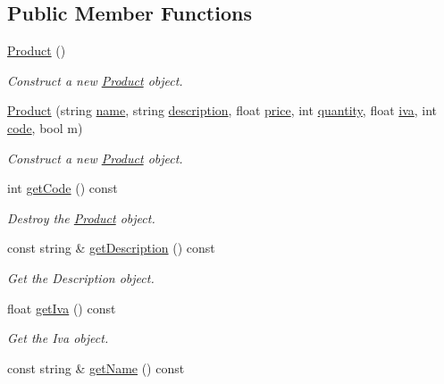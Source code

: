\subsection*{Public Member Functions}
\begin{DoxyCompactItemize}
\item 
\hyperlink{classProduct_a847c1d85e67ce387166a597579a55135}{Product} ()
\begin{DoxyCompactList}\small\item\em Construct a new \hyperlink{classProduct}{Product} object. \end{DoxyCompactList}\item 
\hyperlink{classProduct_af5787b56a6be5a1807ceb7999c6adb6a}{Product} (string \hyperlink{classProduct_acc9bddcf74112d85a6dc231db2269b8d}{name}, string \hyperlink{classProduct_ac39d552b24ce60549271a85aea3f5ed0}{description}, float \hyperlink{classProduct_ad1fd6ee6c8653bf81898668b1d01b05d}{price}, int \hyperlink{classProduct_a299430b8756aba9f6d44af46831791cc}{quantity}, float \hyperlink{classProduct_ac772b7a57928ccfdb02309bde2e4fa33}{iva}, int \hyperlink{classProduct_acf4c1bb9d62717e3b2ecaaf7ec5dffd7}{code}, bool m)
\begin{DoxyCompactList}\small\item\em Construct a new \hyperlink{classProduct}{Product} object. \end{DoxyCompactList}\item 
int \hyperlink{classProduct_ada9a32ed7891875b3ccd8e064aad6492}{get\+Code} () const
\begin{DoxyCompactList}\small\item\em Destroy the \hyperlink{classProduct}{Product} object. \end{DoxyCompactList}\item 
const string \& \hyperlink{classProduct_afffde8c14c3bca709543cea274d67e7c}{get\+Description} () const
\begin{DoxyCompactList}\small\item\em Get the Description object. \end{DoxyCompactList}\item 
float \hyperlink{classProduct_a50605c5d457a7400a8dd5a0848480297}{get\+Iva} () const
\begin{DoxyCompactList}\small\item\em Get the Iva object. \end{DoxyCompactList}\item 
const string \& \hyperlink{classProduct_acbf3d46720bb1a0d16e49663b73b803d}{get\+Name} () const

\end{DoxyCompactItemize}

